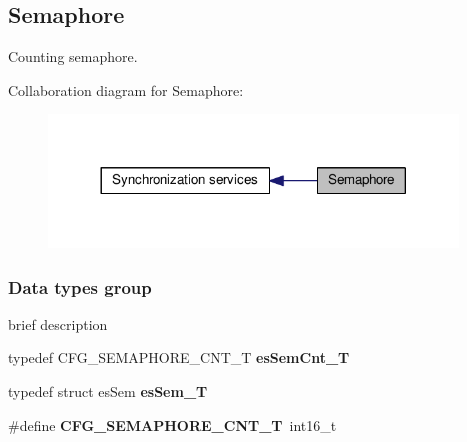 \hypertarget{group__sem__intf}{\subsection{Semaphore}
\label{group__sem__intf}
}


Counting semaphore.  


Collaboration diagram for Semaphore\-:\nopagebreak
\begin{figure}[H]
\begin{center}
\leavevmode
\includegraphics[width=308pt]{group__sem__intf}
\end{center}
\end{figure}
\subsubsection*{Data types group}
\label{_amgrpca30459c90d6b7a12b3df0a1317e654e}%
brief description \begin{DoxyCompactItemize}
\item 
\hypertarget{group__sem__intf_gaa080a10f59ad14ffb1e27d577b10e870}{typedef C\-F\-G\-\_\-\-S\-E\-M\-A\-P\-H\-O\-R\-E\-\_\-\-C\-N\-T\-\_\-\-T {\bfseries es\-Sem\-Cnt\-\_\-\-T}}\label{group__sem__intf_gaa080a10f59ad14ffb1e27d577b10e870}

\item 
\hypertarget{group__sem__intf_ga076de09738f0febcd417f15a9ac15a7e}{typedef struct es\-Sem {\bfseries es\-Sem\-\_\-\-T}}\label{group__sem__intf_ga076de09738f0febcd417f15a9ac15a7e}

\item 
\hypertarget{group__sem__intf_gaf38e40d531c3eb3d03ab29c0a116b235}{\#define {\bfseries C\-F\-G\-\_\-\-S\-E\-M\-A\-P\-H\-O\-R\-E\-\_\-\-C\-N\-T\-\_\-\-T}~int16\-\_\-t}\label{group__sem__intf_gaf38e40d531c3eb3d03ab29c0a116b235}

\end{DoxyCompactItemize}
